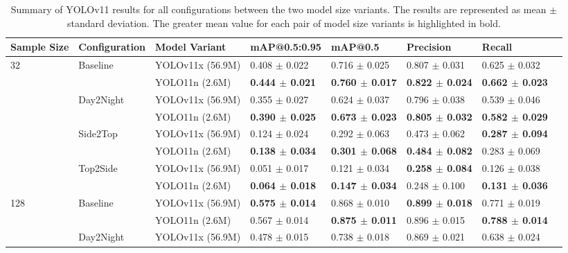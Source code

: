 \begin{table}[H]
    \caption{Summary of YOLOv11 results for all configurations between the two model size variants. The results are represented as mean $\pm$ standard deviation. The greater mean value for each pair of model size variants is highlighted in bold.}
    \centering
    {\footnotesize
    \begin{tabular}{llllllll}
        \toprule
        \textbf{Sample Size} & \textbf{Configuration} & \textbf{Model Variant} & \textbf{mAP@0.5:0.95} & \textbf{mAP@0.5} & \textbf{Precision} & \textbf{Recall} \\
        \midrule
        32  & Baseline  & YOLOv11x (56.9M) & 0.408 $\pm$ 0.022 & 0.716 $\pm$ 0.025 & 0.807 $\pm$ 0.031 & 0.625 $\pm$ 0.032 \\
            &           & YOLO11n (2.6M) & \textbf{0.444 $\pm$ 0.021} & \textbf{0.760 $\pm$ 0.017} & \textbf{0.822 $\pm$ 0.024} & \textbf{0.662 $\pm$ 0.023} \\
        \cmidrule{2-7}
            & Day2Night & YOLOv11x (56.9M) & 0.355 $\pm$ 0.027 & 0.624 $\pm$ 0.037 & 0.796 $\pm$ 0.038 & 0.539 $\pm$ 0.046 \\
            &           & YOLO11n (2.6M) & \textbf{0.390 $\pm$ 0.025} & \textbf{0.673 $\pm$ 0.023} & \textbf{0.805 $\pm$ 0.032} & \textbf{0.582 $\pm$ 0.029} \\
        \cmidrule{2-7}
            & Side2Top  & YOLOv11x (56.9M) & 0.124 $\pm$ 0.024 & 0.292 $\pm$ 0.063 & 0.473 $\pm$ 0.062 & \textbf{0.287 $\pm$ 0.094} \\
            &           & YOLO11n (2.6M) & \textbf{0.138 $\pm$ 0.034} & \textbf{0.301 $\pm$ 0.068} & \textbf{0.484 $\pm$ 0.082} & 0.283 $\pm$ 0.069 \\
        \cmidrule{2-7}
            & Top2Side  & YOLOv11x (56.9M) & 0.051 $\pm$ 0.017 & 0.121 $\pm$ 0.034 & \textbf{0.258 $\pm$ 0.084} & 0.126 $\pm$ 0.038 \\
            &           & YOLO11n (2.6M) & \textbf{0.064 $\pm$ 0.018} & \textbf{0.147 $\pm$ 0.034} & 0.248 $\pm$ 0.100 & \textbf{0.131 $\pm$ 0.036} \\
        \midrule
        128 & Baseline  & YOLOv11x (56.9M) & \textbf{0.575 $\pm$ 0.014} & 0.868 $\pm$ 0.010 & \textbf{0.899 $\pm$ 0.018} & 0.771 $\pm$ 0.019 \\
            &           & YOLO11n (2.6M) & 0.567 $\pm$ 0.014 & \textbf{0.875 $\pm$ 0.011} & 0.896 $\pm$ 0.015 & \textbf{0.788 $\pm$ 0.014} \\
        \cmidrule{2-7}
            & Day2Night & YOLOv11x (56.9M) & 0.478 $\pm$ 0.015 & 0.738 $\pm$ 0.018 & 0.869 $\pm$ 0.021 & 0.638 $\pm$ 0.024 \\

\end{tabular}}
\end{table}
